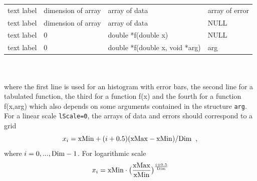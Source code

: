 \documentclass[12pt,a4paper]{article}
\begin{document}
\begin{tabular}{|l|l|l|l|}
\hline
   text label &  dimension  of array     &  array of data               & array of error     \\            
   text label   &      dimension of array            &  array of data               &  NULL              \\  
  text label    &   0             & double *f(double x)  &  NULL              \\                 
   text label    &       0         & double *f(double x, void *arg)&  arg       \\
\hline    
\end{tabular}\\
\\
where the first line is used for an histogram with error bars, the second line for a tabulated function, the third for a function f(x) and the fourth for a function f(x,arg) which also depends on some arguments contained in the structure \verb|arg|.
 For a linear scale  {\tt lScale=0}, the arrays of data  and errors  should correspond to a grid
$$x_i={\rm xMin}+(i+0.5)({\rm xMax}- {\rm xMin})/{\rm Dim}\;\;,$$ 
where $i=0,...,{\rm Dim}-1$. For logarithmic scale  
   $$x_i={\rm xMin}\cdot \big(\frac{{\rm xMax}}{{\rm xMin}}\big)^\frac{i+0.5}{{\rm Dim}}$$




\appendix
\end{document}
